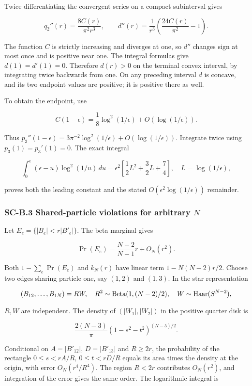Twice differentiating the convergent series on a compact subinterval gives

\[
q_2''(r)=\frac{8C(r)}{\pi^2r^3},\qquad
d''(r)=\frac1{r^3}\left(\frac{24C(r)}{\pi^2}-1\right).
\]

The function \(C\) is strictly increasing and diverges at one, so \(d''\) changes sign at most once and is positive near one. The integral formulas give \(d(1)=d'(1)=0\). Therefore \(d(r)>0\) on the terminal convex interval, by integrating twice backwards from one. On any preceding interval \(d\) is concave, and its two endpoint values are positive; it is positive there as well.

To obtain the endpoint, use

\[
C(1-\epsilon)=\frac18\log^2(1/\epsilon)+O(\log(1/\epsilon)).
\]

Thus \(p_3''(1-\epsilon)=3\pi^{-2}\log^2(1/\epsilon)+O(\log(1/\epsilon))\). Integrate twice using \(p_3(1)=p_3'(1)=0\). The exact integral

\[
\int_0^\epsilon(\epsilon-u)\log^2(1/u)\,du
=\epsilon^2\left[\frac12L^2+\frac32L+\frac74\right],
\quad L=\log(1/\epsilon),
\]

proves both the leading constant and the stated \(O(\epsilon^2\log(1/\epsilon))\) remainder.

\hypertarget{sc-b.3-shared-particle-violations-for-arbitrary-n}{%
\subsubsection{\texorpdfstring{SC-B.3 Shared-particle violations for arbitrary \(N\)}{SC-B.3 Shared-particle violations for arbitrary N}}\label{sc-b.3-shared-particle-violations-for-arbitrary-n}}

Let \(E_e=\{|B_e|<r|B'_e|\}\). The beta marginal gives

\[
\Pr(E_e)=\frac{N-2}{N-1}r+O_N(r^2).
\]

Both \(1-\sum_e\Pr(E_e)\) and \(k_N(r)\) have linear term \(1-N(N-2)r/2\). Choose two edges sharing particle one, say \((1,2)\) and \((1,3)\). In the star representation

\[
(B_{12},\ldots,B_{1N})=RW,\quad
R^2\sim\operatorname{Beta}(1,(N-2)/2),\quad W\sim{\rm Haar}(S^{N-2}),
\]

\(R,W\) are independent. The density of \((|W_1|,|W_2|)\) in the positive quarter disk is

\[
\frac{2(N-3)}{\pi}(1-s^2-t^2)^{(N-5)/2}.
\]

Conditional on \(A=|B'_{12}|\), \(D=|B'_{13}|\) and \(R\geq2r\), the probability of the rectangle \(0\leq s<rA/R,\ 0\leq t<rD/R\) equals its area times the density at the origin, with error \(O_N(r^4/R^4)\). The region \(R<2r\) contributes \(O_N(r^2)\), and integration of the error gives the same order. The logarithmic integral is

